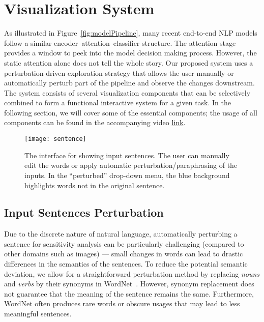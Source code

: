 
\section{Visualization System}
As illustrated in Figure~\ref{fig:modelPipeline}, many recent end-to-end NLP models follow a similar encoder--attention--classifier structure. The attention stage provides a window to peek into the model decision making process. 
However, the static attention alone does not tell the whole story. 
Our proposed system uses a perturbation-driven exploration strategy that allows the user manually or automatically perturb part of the pipeline and observe the changes downstream.
%
The system consists of several visualization components that can be selectively combined to form a functional interactive system for a given task. In the following section, we will cover some of the essential components; the usage of all components can be found in the accompanying video \href{https://www.youtube.com/watch?v=dcpTyWfBhp0}{link}.

\begin{figure}[htbp]
\centering
\vspace{-2mm}
 \texttt{[image: sentence]}
 \vspace{-2mm}
 \caption{
The interface for showing input sentences. The user can manually edit the words or apply automatic perturbation/paraphrasing of the inputs. In the ``perturbed'' drop-down menu, the blue background highlights words not in the original sentence.
 }
 \vspace{-1mm}
\label{fig:sentence}
\end{figure}

\subsection{Input Sentences Perturbation}
\label{sec:perturb}
Due to the discrete nature of natural language, automatically perturbing a sentence for sensitivity analysis can be particularly challenging (compared to other domains such as images) --- small changes in words can lead to drastic differences in the semantics of the sentences.
To reduce the potential semantic deviation, we allow for a straightforward perturbation method by replacing \emph{nouns} and \emph{verbs} by their synonyms in WordNet~\cite{Miller1995}. However, synonym replacement does not guarantee that the meaning of the sentence remains the same. Furthermore, WordNet often produces rare words or obscure usages that may lead to less meaningful sentences.

